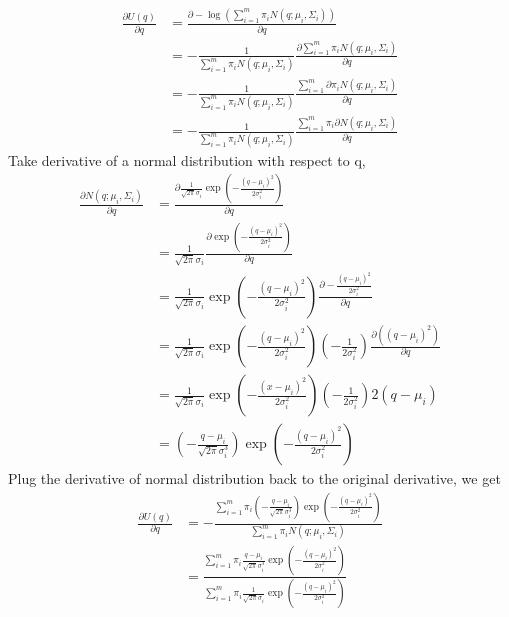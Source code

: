 \documentclass{article}
\begin{document}
\subsubsection{}
\begin{align*}
	\frac{\partial U(q)}{\partial q} & = \frac{\partial -\log\left(\sum_{i=1}^m \pi_iN(q;\mu_i, \Sigma_i)\right)}{\partial q}\\
	&= -\frac{1}{\sum_{i=1}^m \pi_iN(q;\mu_i, \Sigma_i)} \frac{\partial \sum_{i=1}^m \pi_iN(q;\mu_i, \Sigma_i)}{\partial q} \\
	& = -\frac{1}{\sum_{i=1}^m \pi_iN(q;\mu_i, \Sigma_i)} \frac{\sum_{i=1}^m \partial \pi_iN(q;\mu_i, \Sigma_i)}{\partial q} \\
	& = -\frac{1}{\sum_{i=1}^m \pi_iN(q;\mu_i, \Sigma_i)} \frac{\sum_{i=1}^m \pi_i \partial N(q;\mu_i, \Sigma_i)}{\partial q}
\end{align*}
Take derivative of a normal distribution with respect to q,
\begin{align*}
	\frac{\partial N(q;\mu_i, \Sigma_i)}{\partial q} &= \frac{\partial \frac{1}{\sqrt{2\pi}\sigma_i}\exp\left(- \frac{(q-\mu_i)^2}{2\sigma_i^2} \right)}{\partial q} \\
	&= \frac{1}{\sqrt{2\pi}\sigma_i} \frac{\partial \exp\left(- \frac{(q-\mu_i)^2}{2\sigma_i^2} \right)}{\partial q} \\
	& = \frac{1}{\sqrt{2\pi}\sigma_i} \exp\left(- \frac{(q-\mu_i)^2}{2\sigma_i^2} \right) \frac{\partial - \frac{(q-\mu_i)^2}{2\sigma_i^2}}{\partial q} \\
	& = \frac{1}{\sqrt{2\pi}\sigma_i} \exp\left(- \frac{(q-\mu_i)^2}{2\sigma_i^2} \right) \left(-\frac{1}{2\sigma_i^2} \right) \frac{\partial ((q-\mu_i)^2)}{\partial q} \\
	&= \frac{1}{\sqrt{2\pi}\sigma_i} \exp\left(- \frac{(x-\mu_i)^2}{2\sigma_i^2} \right) \left(-\frac{1}{2\sigma_i^2} \right) 2 (q-\mu_i) \\
	& = \left(- \frac{q-\mu_i}{\sqrt{2\pi}\sigma_i^3} \right) \exp\left(- \frac{(q-\mu_i)^2}{2\sigma_i^2} \right)
\end{align*}
Plug the derivative of normal distribution back to the original derivative, we get
\begin{align*}
	\frac{\partial U(q)}{\partial q} & = -\frac{\sum_{i=1}^m \pi_i \left(- \frac{q-\mu_i}{\sqrt{2\pi}\sigma_i^3} \right) \exp\left(- \frac{(q-\mu_i)^2}{2\sigma_i^2} \right)}{\sum_{i=1}^m \pi_iN(q;\mu_i, \Sigma_i)}  \\
	&= \frac{\sum_{i=1}^m \pi_i  \frac{q-\mu_i}{\sqrt{2\pi}\sigma_i^3} \exp\left(- \frac{(q-\mu_i)^2}{2\sigma_i^2} \right)}{\sum_{i=1}^m \pi_i \frac{1}{\sqrt{2\pi}\sigma_i}\exp\left(- \frac{(q-\mu_i)^2}{2\sigma_i^2} \right)}
\end{align*}
\end{document}
